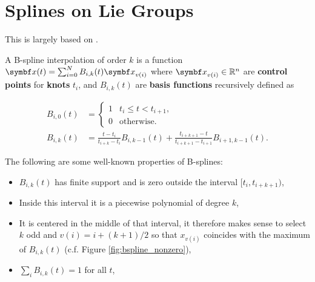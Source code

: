
\chapter{Splines on Lie Groups}

This is largely based on \cite{patron-perez_spline-based_2015, sommer_efficient_2020}.


\begin{figure}[h]
  \begin{center}
  \end{center}
\end{figure}

A B-spline interpolation of order $k$ is a function $\x(t) = \sum_{i=0}^N B_{i, k}(t) \x_{v(i)}$ where $\x_{v(i)} \in \mathbb{R}^n$ are \textbf{control points} for \textbf{knots} $t_i$, and $B_{i, k}(t)$ are \textbf{basis functions} recursively defined as

\begin{equation}
  \label{eq:b_spline_rec}
  \begin{aligned}
    B_{i, 0}(t) & = \begin{cases}
      1 & t_i \leq t < t_{i+1}, \\
      0 & \text{otherwise}.
    \end{cases}                                                                                \\
    B_{i, k}(t) & = \frac{t - t_i}{t_{i+k} - t_i} B_{i, k-1}(t) + \frac{t_{i+k+1} - t}{t_{i+k+1} - t_{i+1}} B_{i+1, k-1}(t).
  \end{aligned}
\end{equation}

The following are some well-known properties of B-splines:
\begin{itemize}
  \item $B_{i, k}(t)$ has finite support and is zero outside the interval $[t_{i}, t_{i+k+1})$,
  \item Inside this interval it is a piecewise polynomial of degree $k$,
  \item It is centered in the middle of that interval, it therefore makes sense to select $k$ odd and $v(i) = i + (k + 1) / 2$ so that $x_{v(i)}$ coincides with the maximum of $B_{i, k}(t)$ (c.f. Figure \ref{fig:bspline_nonzero}),
  \item $\sum_i B_{i, k}(t) = 1$ for all $t$,
\end{itemize}

